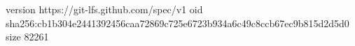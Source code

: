 version https://git-lfs.github.com/spec/v1
oid sha256:cb1b304e2441392456caa72869c725e6723b934a6c49c8ccb67ec9b815d2d5d0
size 82261
